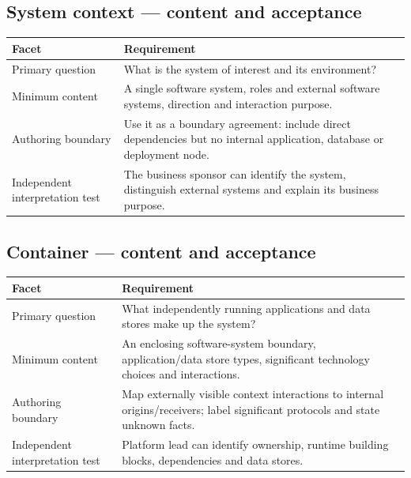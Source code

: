\documentclass[10pt,letterpaper]{article}
\begin{document}
\subsection{System context — content and acceptance}
\begin{tabularx}{\linewidth}{@{}YY@{}}\toprule
\textbf{Facet} & \textbf{Requirement} \\ \midrule
Primary question & What is the system of interest and its environment? \\
Minimum content & A single software system, roles and external software systems, direction and interaction purpose. \\
Authoring boundary & Use it as a boundary agreement: include direct dependencies but no internal application, database or deployment node. \\
Independent interpretation test & The business sponsor can identify the system, distinguish external systems and explain its business purpose. \\
\bottomrule\end{tabularx}

\subsection{Container — content and acceptance}
\begin{tabularx}{\linewidth}{@{}YY@{}}\toprule
\textbf{Facet} & \textbf{Requirement} \\ \midrule
Primary question & What independently running applications and data stores make up the system? \\
Minimum content & An enclosing software-system boundary, application/data store types, significant technology choices and interactions. \\
Authoring boundary & Map externally visible context interactions to internal origins/receivers; label significant protocols and state unknown facts. \\
Independent interpretation test & Platform lead can identify ownership, runtime building blocks, dependencies and data stores. \\
\bottomrule\end{tabularx}
\end{document}

